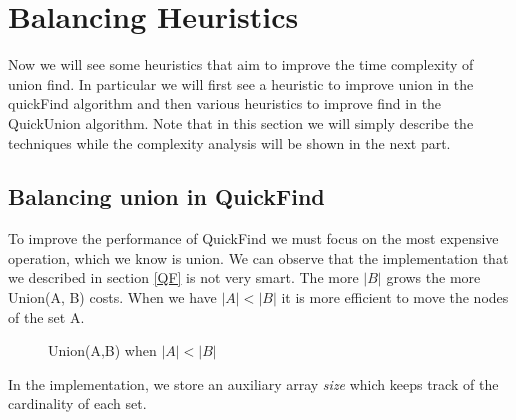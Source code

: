 \documentclass{article}
\begin{document}
\section{Balancing Heuristics}
Now we will see some heuristics that aim to improve the time complexity of union find. In particular
we will first see a heuristic to improve union in the quickFind algorithm and then various heuristics to improve
find in the QuickUnion algorithm. Note that in this section we will simply describe the techniques while the 
complexity analysis will be shown in the next part.
\subsection{Balancing union in QuickFind}
To improve the performance of QuickFind we must focus on the most expensive operation, which we know is 
union. We can observe that the implementation that we described in section \ref{QF} is not very smart. The more $ | B | $ grows the more
Union(A, B) costs. When we have $|A| < |B| $ it is more efficient to move the nodes of the set A.

\begin{figure}[h!]
    \centering
    \caption{Union(A,B) when $|A| < |B|$}
    \label{fig:qfsize}
\end{figure}
In the implementation, we store an auxiliary array \emph{size} which keeps track
of the cardinality of each set.
\end{document}
